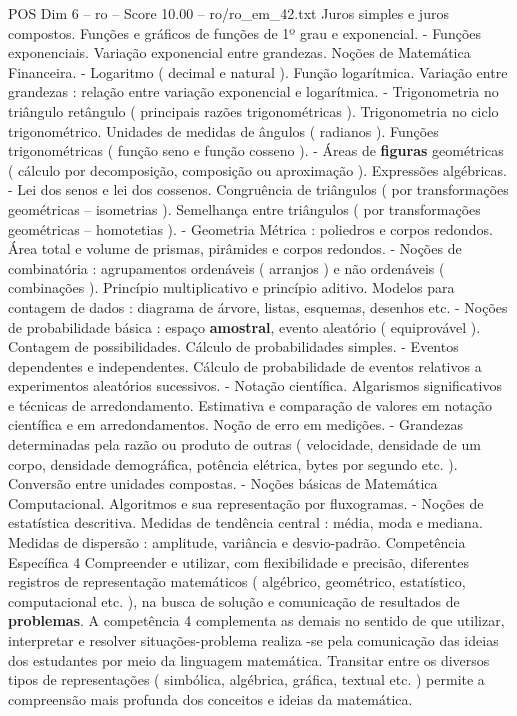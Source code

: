 \begin{textsample}{POS Dim 6 – ro – Score 10.00 – ro/ro\_em\_42.txt}
Juros simples e juros compostos.
Funções e gráficos de funções de 1º grau e exponencial. - Funções exponenciais.
Variação exponencial entre grandezas.
Noções de Matemática Financeira. - Logaritmo ( decimal e natural ).
Função logarítmica.
Variação entre grandezas : relação entre variação exponencial e logarítmica. - Trigonometria no triângulo retângulo ( principais razões trigonométricas ).
Trigonometria no ciclo trigonométrico.
Unidades de medidas de ângulos ( radianos ).
Funções trigonométricas ( função seno e função cosseno ). - Áreas de \textbf{figuras} geométricas ( cálculo por decomposição, composição ou aproximação ).
Expressões algébricas. - Lei dos senos e lei dos cossenos.
Congruência de triângulos ( por transformações geométricas – isometrias ).
Semelhança entre triângulos ( por transformações geométricas – homotetias ). - Geometria Métrica : poliedros e corpos redondos.
Área total e volume de prismas, pirâmides e corpos redondos. - Noções de combinatória : agrupamentos ordenáveis ( arranjos ) e não ordenáveis ( combinações ).
Princípio multiplicativo e princípio aditivo.
Modelos para contagem de dados : diagrama de árvore, listas, esquemas, desenhos etc. - Noções de probabilidade básica : espaço \textbf{amostral}, evento aleatório ( equiprovável ).
Contagem de possibilidades.
Cálculo de probabilidades simples. - Eventos dependentes e independentes.
Cálculo de probabilidade de eventos relativos a experimentos aleatórios sucessivos. - Notação científica.
Algarismos significativos e técnicas de arredondamento.
Estimativa e comparação de valores em notação científica e em arredondamentos.
Noção de erro em medições. - Grandezas determinadas pela razão ou produto de outras ( velocidade, densidade de um corpo, densidade demográfica, potência elétrica, bytes por segundo etc. ).
Conversão entre unidades compostas. - Noções básicas de Matemática Computacional.
Algoritmos e sua representação por fluxogramas. - Noções de estatística descritiva.
Medidas de tendência central : média, moda e mediana.
Medidas de dispersão : amplitude, variância e desvio-padrão.
Competência Específica 4 Compreender e utilizar, com flexibilidade e precisão, diferentes registros de representação matemáticos ( algébrico, geométrico, estatístico, computacional etc. ), na busca de solução e comunicação de resultados de \textbf{problemas}.
A competência 4 complementa as demais no sentido de que utilizar, interpretar e resolver situações-problema realiza -se pela comunicação das ideias dos estudantes por meio da linguagem matemática.
Transitar entre os diversos tipos de representações ( simbólica, algébrica, gráfica, textual etc. ) permite a compreensão mais profunda dos conceitos e ideias da matemática.

\end{textsample}
